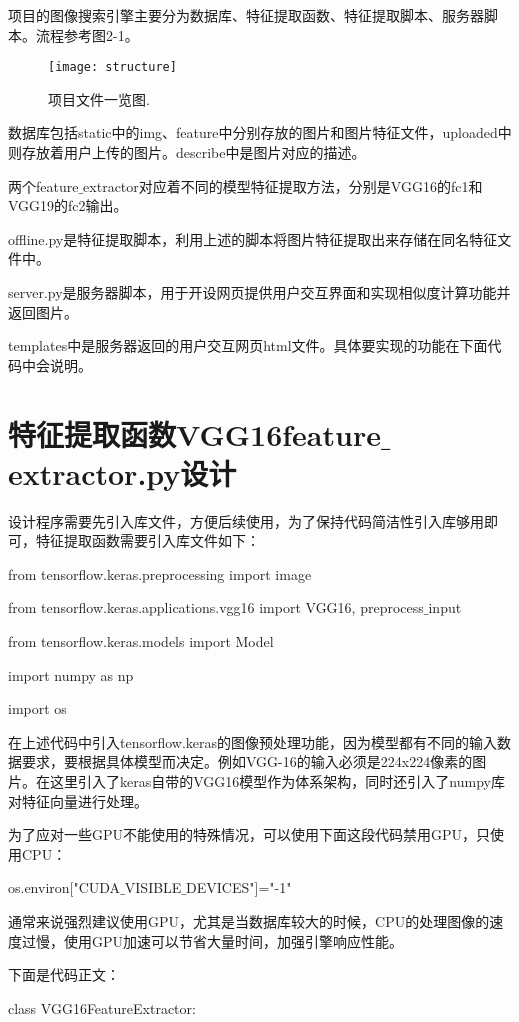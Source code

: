 \documentclass[bachelor_p]{hdu-thesis}
\begin{document}
项目的图像搜索引擎主要分为数据库、特征提取函数、特征提取脚本、服务器脚本。流程参考图2-1。

\begin{figure}[!htb]
  \centering
  \texttt{[image: structure]}
  \caption{项目文件一览图.}
  \label{fig_structure}
\end{figure}

数据库包括static中的img、feature中分别存放的图片和图片特征文件，uploaded中则存放着用户上传的图片。describe中是图片对应的描述。

两个feature$\_$extractor对应着不同的模型特征提取方法，分别是VGG16的fc1和VGG19的fc2输出。

offline.py是特征提取脚本，利用上述的脚本将图片特征提取出来存储在同名特征文件中。

server.py是服务器脚本，用于开设网页提供用户交互界面和实现相似度计算功能并返回图片。

templates中是服务器返回的用户交互网页html文件。具体要实现的功能在下面代码中会说明。


\section{特征提取函数VGG16feature$\_$extractor.py设计}

设计程序需要先引入库文件，方便后续使用，为了保持代码简洁性引入库够用即可，特征提取函数需要引入库文件如下：

from tensorflow.keras.preprocessing import image

from tensorflow.keras.applications.vgg16 import VGG16, preprocess$\_$input

from tensorflow.keras.models import Model

import numpy as np

import os

在上述代码中引入tensorflow.keras的图像预处理功能，因为模型都有不同的输入数据要求，要根据具体模型而决定。例如VGG-16的输入必须是224x224像素的图片。在这里引入了keras自带的VGG16模型作为体系架构，同时还引入了numpy库对特征向量进行处理。

为了应对一些GPU不能使用的特殊情况，可以使用下面这段代码禁用GPU，只使用CPU：

os.environ["CUDA$\_$VISIBLE$\_$DEVICES"]="-1"

通常来说强烈建议使用GPU，尤其是当数据库较大的时候，CPU的处理图像的速度过慢，使用GPU加速可以节省大量时间，加强引擎响应性能。

下面是代码正文：

class VGG16FeatureExtractor:
\end{document}
